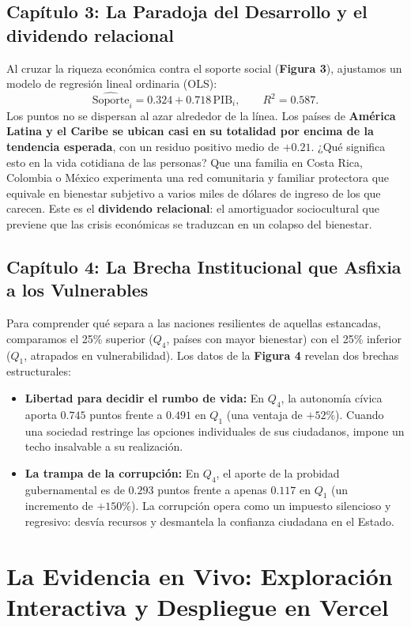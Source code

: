 \documentclass[9.5pt, a4paper]{article}
\begin{document}
\subsection{Capítulo 3: La Paradoja del Desarrollo y el dividendo relacional}
Al cruzar la riqueza económica contra el soporte social (\textbf{Figura 3}), ajustamos un modelo de regresión lineal ordinaria (OLS):
\begin{equation}
    \widehat{\text{Soporte}}_i = 0.324 + 0.718 \, \text{PIB}_i, \qquad R^2 = 0.587. \label{eq:ols}
\end{equation}
Los puntos no se dispersan al azar alrededor de la línea. Los países de \textbf{América Latina y el Caribe se ubican casi en su totalidad por encima de la tendencia esperada}, con un residuo positivo medio de $+0.21$. ¿Qué significa esto en la vida cotidiana de las personas? Que una familia en Costa Rica, Colombia o México experimenta una red comunitaria y familiar protectora que equivale en bienestar subjetivo a varios miles de dólares de ingreso de los que carecen. Este es el \textbf{dividendo relacional}: el amortiguador sociocultural que previene que las crisis económicas se traduzcan en un colapso del bienestar.

\subsection{Capítulo 4: La Brecha Institucional que Asfixia a los Vulnerables}
Para comprender qué separa a las naciones resilientes de aquellas estancadas, comparamos el 25\% superior ($Q_4$, países con mayor bienestar) con el 25\% inferior ($Q_1$, atrapados en vulnerabilidad). Los datos de la \textbf{Figura 4} revelan dos brechas estructurales:
\begin{itemize}
    \item \textbf{Libertad para decidir el rumbo de vida:} En $Q_4$, la autonomía cívica aporta $0.745$ puntos frente a $0.491$ en $Q_1$ (una ventaja de $+52\%$). Cuando una sociedad restringe las opciones individuales de sus ciudadanos, impone un techo insalvable a su realización.
    \item \textbf{La trampa de la corrupción:} En $Q_4$, el aporte de la probidad gubernamental es de $0.293$ puntos frente a apenas $0.117$ en $Q_1$ (un incremento de $+150\%$). La corrupción opera como un impuesto silencioso y regresivo: desvía recursos y desmantela la confianza ciudadana en el Estado.
\end{itemize}

\section{La Evidencia en Vivo: Exploración Interactiva y Despliegue en Vercel}
\end{document}
